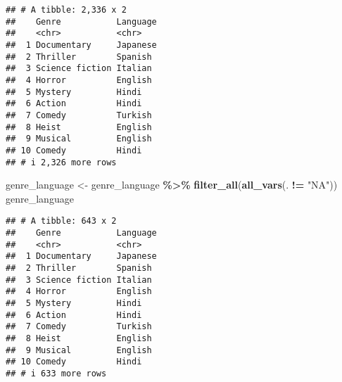 \documentclass[
]{article}
\newenvironment{Shaded}{\begin{snugshade}}{\end{snugshade}}
\newcommand{\FunctionTok}[1]{\textcolor[rgb]{0.13,0.29,0.53}{\textbf{#1}}}
\newcommand{\NormalTok}[1]{#1}
\newcommand{\OtherTok}[1]{\textcolor[rgb]{0.56,0.35,0.01}{#1}}
\newcommand{\SpecialCharTok}[1]{\textcolor[rgb]{0.81,0.36,0.00}{\textbf{#1}}}
\newcommand{\StringTok}[1]{\textcolor[rgb]{0.31,0.60,0.02}{#1}}
\begin{document}
\begin{Shaded}
\end{Shaded}

\begin{verbatim}
## # A tibble: 2,336 x 2
##    Genre           Language
##    <chr>           <chr>   
##  1 Documentary     Japanese
##  2 Thriller        Spanish 
##  3 Science fiction Italian 
##  4 Horror          English 
##  5 Mystery         Hindi   
##  6 Action          Hindi   
##  7 Comedy          Turkish 
##  8 Heist           English 
##  9 Musical         English 
## 10 Comedy          Hindi   
## # i 2,326 more rows
\end{verbatim}

\begin{Shaded}
\begin{Highlighting}[]
\NormalTok{genre\_language }\OtherTok{\textless{}{-}}\NormalTok{ genre\_language }\SpecialCharTok{\%\textgreater{}\%} \FunctionTok{filter\_all}\NormalTok{(}\FunctionTok{all\_vars}\NormalTok{(. }\SpecialCharTok{!=} \StringTok{"NA"}\NormalTok{))}
\NormalTok{genre\_language}
\end{Highlighting}
\end{Shaded}

\begin{verbatim}
## # A tibble: 643 x 2
##    Genre           Language
##    <chr>           <chr>   
##  1 Documentary     Japanese
##  2 Thriller        Spanish 
##  3 Science fiction Italian 
##  4 Horror          English 
##  5 Mystery         Hindi   
##  6 Action          Hindi   
##  7 Comedy          Turkish 
##  8 Heist           English 
##  9 Musical         English 
## 10 Comedy          Hindi   
## # i 633 more rows
\end{verbatim}
\end{document}
